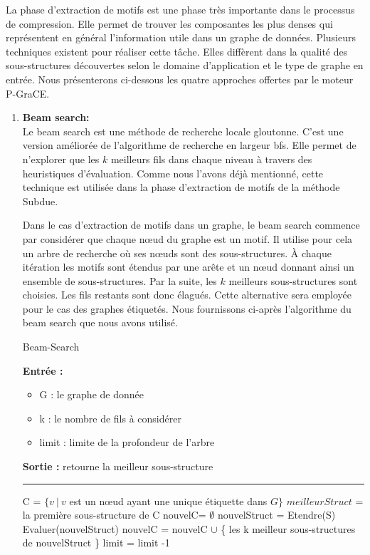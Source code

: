 \documentclass[a4paper,oneside,12pt]{report}
\theoremstyle{definition}
\begin{document}
La phase d'extraction de motifs est une phase très importante dans le processus de compression. Elle permet de trouver les composantes les plus denses qui représentent en général l'information utile dans un graphe de données. Plusieurs techniques existent pour réaliser cette tâche. Elles diffèrent dans la qualité des sous-structures découvertes selon le domaine d'application et le type de graphe en entrée. Nous présenterons ci-dessous les quatre approches offertes par le moteur P-GraCE.
		
\begin{enumerate}

\item \textbf{Beam search:}\\
Le beam search est une méthode de recherche locale gloutonne. C'est une version améliorée de l'algorithme de recherche en largeur \gls{bfs}. Elle permet de n'explorer que les $k$ meilleurs fils dans chaque niveau à travers des heuristiques d'évaluation. Comme nous l'avons déjà mentionné, cette technique est utilisée dans la phase d'extraction de motifs de la méthode Subdue.

Dans le cas d'extraction de motifs dans un graphe, le beam search commence par considérer que chaque nœud du graphe est un motif. Il utilise pour cela un arbre de recherche où ses nœuds sont des sous-structures. À chaque itération les motifs sont étendus par une arête et un nœud donnant ainsi un ensemble de sous-structures. Par la suite, les $k$ meilleurs sous-structures sont choisies. Les fils restants sont donc élagués. %
Cette alternative sera employée pour le cas des graphes étiquetés. Nous fournissons ci-après l'algorithme du beam search que nous avons utilisé. 


\begin{algorithm}[H]
					\label{alg:beamSearch}
					\caption{Beam-Search}
					\textbf{Entrée :}
						\begin{itemize}[label=$\bullet$]
							\item G : le graphe de donnée
							\item k : le nombre de fils à considérer
							\item limit : limite de la profondeur de l'arbre
						\end{itemize}
					\textbf{Sortie :} retourne la meilleur sous-structure\\							\noindent\rule{\textwidth}{1pt}
						
						
				\begin{algorithmic} [1]
					\STATE C = $\{v\ |\ v$ est un nœud ayant une unique étiquette dans  $G\}$
					\STATE $meilleurStruct$ = la première sous-structure de C
					\REPEAT
					\STATE nouvelC= $\emptyset$
						\STATE nouvelStruct = Etendre(S)
						\STATE Evaluer(nouvelStruct)
						\STATE nouvelC = nouvelC $\cup$ \{ les k meilleur sous-structures de nouvelStruct \}
					\ENDFOR
					\STATE limit = limit -1
					

\end{algorithmic}
\end{algorithm}
\end{enumerate}
\end{document}
